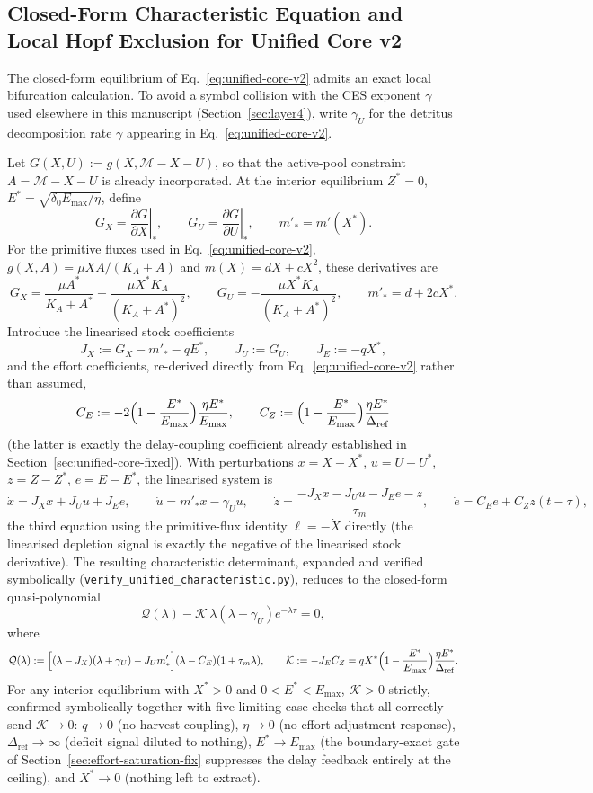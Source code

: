 \documentclass[twocolumn,10pt]{article}
\begin{document}
\subsection{Closed-Form Characteristic Equation and Local Hopf Exclusion for Unified Core v2}
\label{sec:unified-characteristic}
The closed-form equilibrium of Eq.~\eqref{eq:unified-core-v2} admits an exact local bifurcation calculation. To avoid a symbol collision with the CES exponent $\gamma$ used elsewhere in this manuscript (Section~\ref{sec:layer4}), write $\gamma_U$ for the detritus decomposition rate $\gamma$ appearing in Eq.~\eqref{eq:unified-core-v2}.

Let $G(X,U):=g(X,\mathcal M-X-U)$, so that the active-pool constraint $A=\mathcal M-X-U$ is already incorporated. At the interior equilibrium $Z^*=0$, $E^*=\sqrt{\delta_0E_{\max}/\eta}$, define
\[
G_X=\left.\frac{\partial G}{\partial X}\right|_*, \qquad G_U=\left.\frac{\partial G}{\partial U}\right|_*, \qquad m'_*=m'(X^*).
\]
For the primitive fluxes used in Eq.~\eqref{eq:unified-core-v2}, $g(X,A)=\mu XA/(K_A+A)$ and $m(X)=dX+cX^2$, these derivatives are
\[
G_X=\frac{\mu A^*}{K_A+A^*}-\frac{\mu X^*K_A}{(K_A+A^*)^2}, \qquad G_U=-\frac{\mu X^*K_A}{(K_A+A^*)^2}, \qquad m'_*=d+2cX^*.
\]
Introduce the linearised stock coefficients
\[
J_X:=G_X-m'_*-qE^*, \qquad J_U:=G_U, \qquad J_E:=-qX^*,
\]
and the effort coefficients, re-derived directly from Eq.~\eqref{eq:unified-core-v2} rather than assumed,
\[
C_E:=-2\Bigl(1-\frac{E^*}{E_{\max}}\Bigr)\frac{\eta E^*}{E_{\max}}, \qquad C_Z:=\Bigl(1-\frac{E^*}{E_{\max}}\Bigr)\frac{\eta E^*}{\Delta_{\text{ref}}}
\]
(the latter is exactly the delay-coupling coefficient already established in Section~\ref{sec:unified-core-fixed}). With perturbations $x=X-X^*$, $u=U-U^*$, $z=Z-Z^*$, $e=E-E^*$, the linearised system is
\[
\dot x = J_X x + J_U u + J_E e, \qquad \dot u = m'_* x - \gamma_U u, \qquad \dot z = \frac{-J_X x - J_U u - J_E e - z}{\tau_m}, \qquad \dot e = C_E e + C_Z z(t-\tau),
\]
the third equation using the primitive-flux identity $\ell=-\dot X$ directly (the linearised depletion signal is exactly the negative of the linearised stock derivative). The resulting characteristic determinant, expanded and verified symbolically (\texttt{verify\_unified\_characteristic.py}), reduces to the closed-form quasi-polynomial
\begin{equation}
\mathcal Q(\lambda) - \mathcal K\,\lambda(\lambda+\gamma_U)e^{-\lambda\tau} = 0,
\label{eq:unified-char-eq}
\end{equation}
where
\[
\mathcal Q(\lambda) := \Bigl[(\lambda-J_X)(\lambda+\gamma_U)-J_U m'_*\Bigr](\lambda-C_E)(1+\tau_m\lambda), \qquad \mathcal K:=-J_EC_Z = qX^*\Bigl(1-\frac{E^*}{E_{\max}}\Bigr)\frac{\eta E^*}{\Delta_{\text{ref}}}.
\]
For any interior equilibrium with $X^*>0$ and $0<E^*<E_{\max}$, $\mathcal K>0$ strictly, confirmed symbolically together with five limiting-case checks that all correctly send $\mathcal K\to0$: $q\to0$ (no harvest coupling), $\eta\to0$ (no effort-adjustment response), $\Delta_{\text{ref}}\to\infty$ (deficit signal diluted to nothing), $E^*\to E_{\max}$ (the boundary-exact gate of Section~\ref{sec:effort-saturation-fix} suppresses the delay feedback entirely at the ceiling), and $X^*\to0$ (nothing left to extract).
\end{document}
